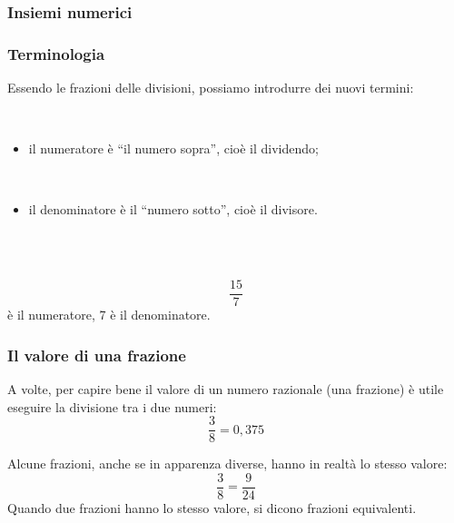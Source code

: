 \documentclass[]{beamer}
\theoremstyle{plain}
\begin{document}
\begin{frame}
\frametitle{Insiemi numerici}
\begin{figure}
\end{figure}
\end{frame}







\begin{frame}
\frametitle{Terminologia}
Essendo le frazioni delle divisioni, possiamo introdurre dei nuovi termini:

~

\begin{itemize}
  \item il \alert{numeratore} è ``il numero sopra'', cioè il dividendo;\pause
  
  ~
  \item il \alert{denominatore} è il ``numero sotto'', cioè il divisore.\pause
\end{itemize}

~

~
\[\frac{15}{7}\] è il numeratore, 7 è il denominatore.
\end{frame}





\begin{frame}
\frametitle{Il valore di una frazione}
A volte, per capire bene il valore di un numero razionale (una frazione) è utile \alert{eseguire la divisione tra i due numeri}:
\[\frac{3}{8}=0,375\]\pause

Alcune frazioni, anche se in apparenza diverse, hanno in realtà \alert{lo stesso valore}:
\[\frac{3}{8}=\frac{9}{24}\]\pause
Quando due frazioni hanno lo stesso valore, si dicono \alert{frazioni equivalenti}.
  

\end{frame}
\end{document}
